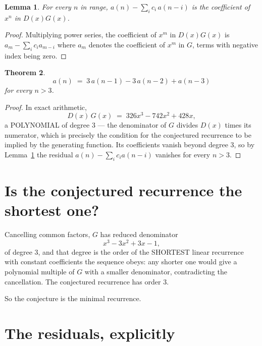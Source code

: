 \documentclass[11pt,a4paper]{article}
\theoremstyle{plain}
\newtheorem{theorem}{Theorem}
\newtheorem{lemma}[theorem]{Lemma}
\theoremstyle{definition}
\begin{document}
\begin{lemma}\label{lem:key}
For every $n$ in range, $a(n)-\sum_i c_i\,a(n-i)$ is the coefficient of $x^{n}$ in
$D(x)G(x)$.
\end{lemma}

\begin{proof}
Multiplying power series, the coefficient of $x^{m}$ in $D(x)G(x)$ is
$a_m-\sum_i c_i a_{m-i}$ where $a_m$ denotes the coefficient of $x^{m}$ in $G$, terms with
negative index being zero.
\end{proof}

\begin{theorem}
\[
a(n)\;=\;3\,a(n-1) - 3\,a(n-2) + a(n-3)
\]
for every $n>3$.
\end{theorem}

\begin{proof}
In exact arithmetic,
\[
D(x)\,G(x)\;=\;326 x^{3} - 742 x^{2} + 428 x,
\]
a POLYNOMIAL of degree $3$ --- the denominator of $G$ divides $D(x)$ times its numerator,
which is precisely the condition for the conjectured recurrence to be implied by the
generating function. Its coefficients vanish beyond degree $3$, so by
Lemma~\ref{lem:key} the residual $a(n)-\sum_ic_ia(n-i)$ vanishes for every
$n>3$.
\end{proof}

\section{Is the conjectured recurrence the shortest one?}

Cancelling common factors, $G$ has reduced denominator
\[
x^{3} - 3 x^{2} + 3 x - 1,
\]
of degree $3$, and that degree is the order of the SHORTEST linear recurrence with
constant coefficients the sequence obeys: any shorter one would give a polynomial multiple of
$G$ with a smaller denominator, contradicting the cancellation. The conjectured recurrence has
order $3$.

So the conjecture is the minimal recurrence.

\section{The residuals, explicitly}
\end{document}
